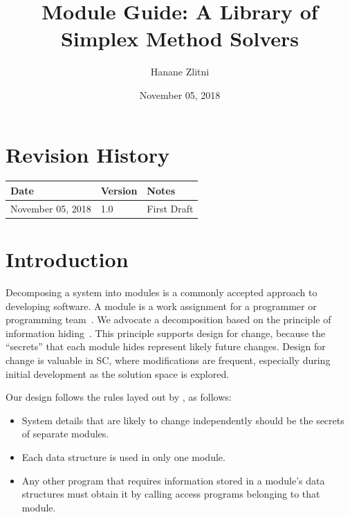 \documentclass[12pt, titlepage]{article}
\begin{document}
\title{Module Guide: A Library of Simplex Method Solvers } 
\author{Hanane Zlitni}
\date{November 05, 2018}

\maketitle


\section{Revision History}

\begin{tabularx}{\textwidth}{p{3cm}p{2cm}X}
\toprule {\bf Date} & {\bf Version} & {\bf Notes}\\
\midrule
November 05, 2018 & 1.0 & First Draft\\
\bottomrule
\end{tabularx}

\newpage

\tableofcontents

\listoftables

\listoffigures

\newpage


\section{Introduction}

Decomposing a system into modules is a commonly accepted approach to developing
software.  A module is a work assignment for a programmer or programming
team~\citep{ParnasEtAl1984}.  We advocate a decomposition
based on the principle of information hiding~\citep{Parnas1972a}.  This
principle supports design for change, because the ``secrets'' that each module
hides represent likely future changes.  Design for change is valuable in SC,
where modifications are frequent, especially during initial development as the
solution space is explored.  

Our design follows the rules layed out by \citet{ParnasEtAl1984}, as follows:
\begin{itemize}
\item System details that are likely to change independently should be the
  secrets of separate modules.
\item Each data structure is used in only one module.
\item Any other program that requires information stored in a module's data
  structures must obtain it by calling access programs belonging to that module.
\end{itemize}
\end{document}
